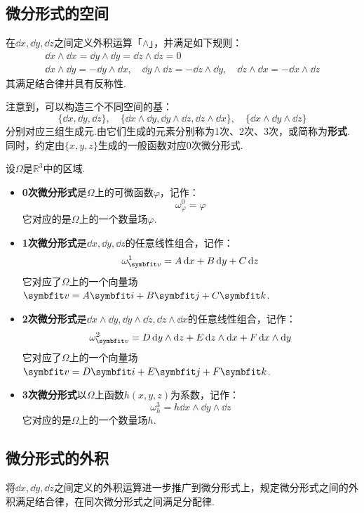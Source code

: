 \subsection{微分形式的空间}
在$\dd{x},\dd{y},\dd{z}$之间定义外积运算「$\wedge$」，并满足如下规则：
\begin{gather*}
    \dd{x}\wedge\dd{x} = \dd{y}\wedge\dd{y} = \dd{z}\wedge\dd{z} = 0 \\
    \dd{x}\wedge\dd{y} = -\dd{y}\wedge\dd{x},\quad \dd{y}\wedge\dd{z} = -\dd{z}\wedge\dd{y},\quad \dd{z}\wedge\dd{x} = -\dd{x}\wedge\dd{z}
\end{gather*}
其满足结合律并具有反称性.

注意到，可以构造三个不同空间的基：
\[\{\dd{x},\dd{y},\dd{z}\},\quad \{\dd{x}\wedge\dd{y},\dd{y}\wedge\dd{z},\dd{z}\wedge\dd{x}\},\quad\{\dd{x}\wedge\dd{y}\wedge\dd{z}\}\]
分别对应三组生成元.由它们生成的元素分别称为1次、2次、3次，或简称为\textbf{形式}.同时，约定由$\{x,y,z\}$生成的一般函数对应0次微分形式.

\begin{definition}
    设$\Omega$是$\mathbb{R}^3$中的区域.
    \begin{itemize}
        \item \textbf{0次微分形式}是$\Omega$上的可微函数$\varphi$，记作：
        \[\omega^0_\varphi = \varphi\]
        它对应的是$\Omega$上的一个数量场$\varphi$.
        \item \textbf{1次微分形式}是$\dd{x},\dd{y},\dd{z}$的任意线性组合，记作：
        \[\omega^1_{\vb{v}} = A\dd{x} + B\dd{y} + C\dd{z}\]
        它对应了$\Omega$上的一个向量场$\vb{v} = A\vb{i} + B\vb{j} + C\vb{k}$.
        \item \textbf{2次微分形式}是$\dd{x}\wedge\dd{y},\dd{y}\wedge\dd{z},\dd{z}\wedge\dd{x}$的任意线性组合，记作：
        \[\omega^2_{\vb{v}} = D\dd{y}\wedge\dd{z} + E\dd{z}\wedge\dd{x} + F\dd{x}\wedge\dd{y}\]
        它对应了$\Omega$上的一个向量场$\vb{v} = D\vb{i} + E\vb{j} + F\vb{k}$.
        \item \textbf{3次微分形式}以$\Omega$上函数$h(x,y,z)$为系数，记作：
        \[\omega^3_h = h\dd{x}\wedge\dd{y}\wedge\dd{z}\]
        它对应的是$\Omega$上的一个数量场$h$.
    \end{itemize}
\end{definition}


\subsection{微分形式的外积}
将$\dd{x},\dd{y},\dd{z}$之间定义的外积运算进一步推广到微分形式上，规定微分形式之间的外积满足结合律，在同次微分形式之间满足分配律.

